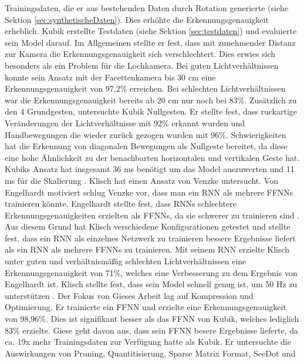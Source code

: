 Trainingsdaten, die er aus bestehenden Daten durch Rotation generierte (siehe Sektion \ref{sec:synthetischeDaten}). Dies erhöhte die Erkennungsgenauigkeit erheblich. Kubik erstellte Testdaten (siehe
Sektion \ref{sec:testdaten}) und evaluierte sein Model darauf. Im Allgemeinen stellte er fest, dass mit zunehmender Distanz zur Kamera die Erkennungsgenauigkeit sich verschlechtert. Dies erwies sich besonders als ein
Problem für die Lochkamera. Bei guten Lichtverhältnissen konnte sein Ansatz mit der Facettenkamera bis 30 cm eine Erkennungsgenauigkeit von 97,2\% erreichen. Bei schlechten Lichtverhältnissen war die Erkennungsgenauigkeit
bereits ab 20 cm nur noch bei 83\%. Zusätzlich zu den 4 Grundgesten, untersuchte Kubik Nullgesten. Er stellte fest, dass ruckartige Veränderungen der Lichtverhältnisse mit 92\% erkannt wurden und Handbewegungen die wieder
zurück gezogen wurden mit 96\%. Schwierigkeiten hat die Erkennung von diagonalen Bewegungen als Nullgeste bereitet, da diese eine hohe Ähnlichkeit zu der benachbarten horizontalen und vertikalen Geste hat. Kubiks Ansatz
hat insgesamt 36 ms benötigt um das Model auszuwerten und 11 ms für die Skalierung \cite{kubikThesis}.
\newline
\newline
Klisch hat einen Ansatz von Venzke untersucht. Von Engelhardt motiviert schlug Venzke vor, dass man ein RNN als mehrere FFNNs trainieren könnte. Engelhardt stellte fest, dass RNNs schlechtere
Erkennungsgenauigkeiten erzielten als FFNNs, da sie schwerer zu trainieren sind \cite{engelhardtThesis}. Aus diesem Grund hat Klisch verschiedene Konfigurationen getestet und stellte fest,
dass ein RNN als einzelnes Netzwerk zu trainieren bessere Ergebnisse liefert als ein RNN als mehrere FFNNs zu trainieren. Mit seinem RNN erzielte Klisch unter guten und verhältnismäßig
schlechten Lichtverhältnissen eine Erkennungsgenauigkeit von 71\%, welches eine Verbesserung zu dem Ergebnis von Engelhardt ist.
Klisch stellte fest, dass sein Model schnell genug ist, um 50 Hz zu unterstützen \cite{klischThesis}.
\newline
\newline
Der Fokus von Gieses Arbeit lag auf Kompression und Optimierung. Er trainierte ein FFNN und erzielte eine Erkennungsgenauigkeit von 98,96\%. Dies ist signifikant besser als das FFNN von Kubik, welches lediglich 83\% erzielte.
Giese geht davon aus, dass sein FFNN besere Ergebnisse lieferte, da ca. 19x mehr Trainingsdaten zur Verfügung hatte als Kubik. Er untersuchte die Auswirkungen von Pruning, Quantitisierung, Sparse Matrix Format, SeeDot und
